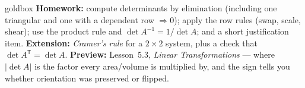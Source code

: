 \documentclass[10pt]{article}
\newcommand{\T}{\mathsf{T}}
\begin{document}
\begin{skillbox}{goldbox}
\textbf{Homework:} compute determinants by elimination (including one triangular and one with a
dependent row $\Rightarrow0$); apply the row rules (swap, scale, shear); use the product rule and
$\det A^{-1}=1/\det A$; and a short justification item. \textbf{Extension:} \emph{Cramer's rule} for a
$2\times2$ system, plus a check that $\det A^{\T}=\det A$. \textbf{Preview:} Lesson~5.3, \emph{Linear
Transformations} --- where $|\det A|$ is the factor every area/volume is multiplied by, and the sign
tells you whether orientation was preserved or flipped.
\end{skillbox}
\end{document}
